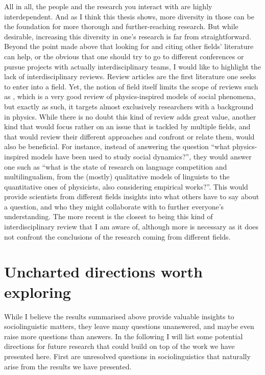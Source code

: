 \documentclass[../thesis.tex]{subfiles}
\begin{document}
All in all, the people and the research you interact with are highly interdependent. And
as I think this thesis shows, more diversity in those can be the foundation for more
thorough and further-reaching research. But while desirable, increasing this diversity
in one's research is far from straightforward. Beyond the point made above that looking
for and citing other fields' literature can help, or the obvious that one should try to
go to different conferences or pursue projects with actually interdisciplinary teams, I
would like to highlight the lack of interdisciplinary reviews. Review articles are the
first literature one seeks to enter into a field. Yet, the notion of field itself limits
the scope of reviews such as \cite{CastellanoStatisticalPhysics2009}, which is a very
good review of physics-inspired models of social phenomena, but exactly as such, it
targets almost exclusively researchers with a background in physics. While there is no
doubt this kind of review adds great value, another kind that would focus rather on an
issue that is tackled by multiple fields, and that would review their different
approaches and confront or relate them, would also be beneficial. For instance, instead
of answering the question ``what physics-inspired models have been used to study social
dynamics?'', they would answer one such as ``what is the state of research on language
competition and multilingualism, from the (mostly) qualitative models of linguists to
the quantitative ones of physicists, also considering empirical works?''. This would
provide scientists from different fields insights into  what others have to say about a
question, and who they might collaborate with to further everyone's understanding. The
more recent \cite{BoissonneaultSystematicInterdisciplinary2021} is the closest to being
this kind of interdisciplinary review that I am aware of, although more is necessary as
it does not confront the conclusions of the research coming from different fields.





\section{Uncharted directions worth exploring}
While I believe the results summarised above provide valuable insights to
sociolinguistic matters, they leave many questions unanswered, and maybe even raise more
questions than answers. In the following I will list some potential directions for
future research that could build on top of the work we have presented here. First are
unresolved questions in sociolinguistics that naturally arise from the results we have
presented.
\end{document}

